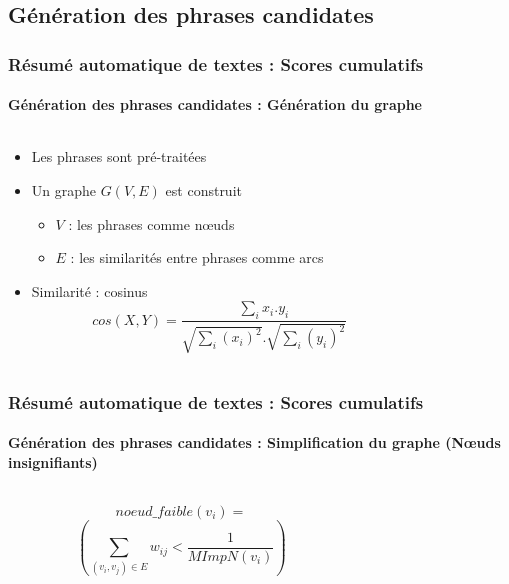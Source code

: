 \documentclass[xcolor=table]{beamer}
\begin{document}
\subsection{Génération des phrases candidates}

\begin{frame}
\frametitle{Résumé automatique de textes : Scores cumulatifs}
\framesubtitle{Génération des phrases candidates : Génération du graphe}
	
\begin{columns}
	\begin{column}{0.45\textwidth}
		\begin{itemize}
			\item Les phrases sont pré-traitées
			\item Un graphe $ G(V, E) $ est construit 
			\begin{itemize}
				\item $V$ : les phrases comme nœuds
				\item $E$ : les similarités entre phrases comme arcs
			\end{itemize}
			\item Similarité : cosinus 
			\[cos(X,Y) = \frac {\sum_i {x_i.y_i} }
			{\sqrt{\sum_i(x_i)^2} . \sqrt{\sum_i(y_i)^2}}\]
		\end{itemize}
	\end{column}
	\begin{column}{0.45\textwidth}
	\end{column}
\end{columns}

\end{frame}

\begin{frame}
\frametitle{Résumé automatique de textes : Scores cumulatifs}
\framesubtitle{Génération des phrases candidates : Simplification du graphe (Nœuds insignifiants)}

\begin{columns}
	\begin{column}{0.45\textwidth}
		
		\[noeud\_faible(v_i) = \]
		\[( \sum_{(v_i, v_j) \in E} w_{ij} < \frac{1}{MImpN(v_i)} )\]
		
	\end{column}
	\begin{column}{0.45\textwidth}
	\end{column}
\end{columns}
	
\end{frame}
\end{document}
